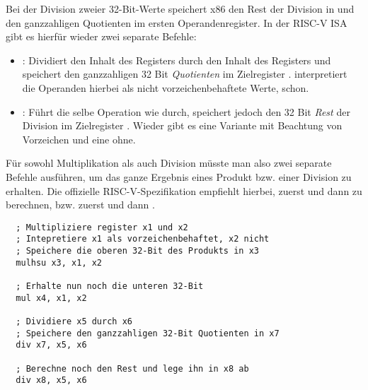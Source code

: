 Bei der Division zweier 32-Bit-Werte speichert x86 den Rest der Division in
 und den ganzzahligen Quotienten im ersten Operandenregister. In der
RISC-V ISA gibt es hierfür wieder zwei separate Befehle:

\begin{itemize}
\item {}: Dividiert den Inhalt des Registers 
  durch den Inhalt des Registers  und speichert den ganzzahligen 32 Bit
  \emph{Quotienten} im Zielregister .  interpretiert die
  Operanden hierbei als nicht vorzeichenbehaftete Werte,  schon.
  \item {}: Führt die selbe Operation wie 
    durch, speichert jedoch den 32 Bit \emph{Rest} der Division im Zielregister
    . Wieder gibt es eine Variante mit Beachtung von Vorzeichen und
    eine ohne.
\end{itemize}

Für sowohl Multiplikation als auch Division müsste man also zwei separate
Befehle ausführen, um das ganze Ergebnis eines Produkt bzw. einer Division zu
erhalten. Die offizielle RISC-V-Spezifikation empfiehlt hierbei, zuerst
 und dann  zu berechnen, bzw. zuerst 
und dann .

\begin{lstlisting}
  ; Multipliziere register x1 und x2
  ; Intepretiere x1 als vorzeichenbehaftet, x2 nicht
  ; Speichere die oberen 32-Bit des Produkts in x3
  mulhsu x3, x1, x2

  ; Erhalte nun noch die unteren 32-Bit
  mul x4, x1, x2

  ; Dividiere x5 durch x6
  ; Speichere den ganzzahligen 32-Bit Quotienten in x7
  div x7, x5, x6

  ; Berechne noch den Rest und lege ihn in x8 ab
  div x8, x5, x6
\end{lstlisting}
